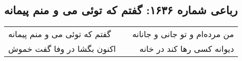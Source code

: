 \begin{center}
\section*{رباعی شماره ۱۶۳۶: گفتم که توئی می و منم پیمانه}
\label{sec:1636}
\begin{longtable}{l p{0.5cm} r}
گفتم که توئی می و منم پیمانه
&&
من مرده‌ام و تو جانی و جانانه
\\
اکنون بگشا در وفا گفت خموش
&&
دیوانه کسی رها کند در خانه
\\
\end{longtable}
\end{center}
